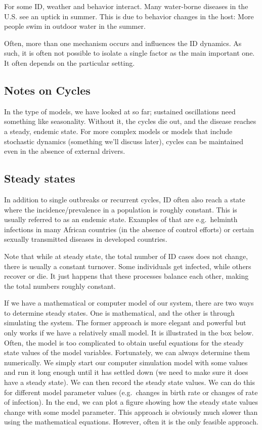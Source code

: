 \documentclass[]{article}
\theoremstyle{definition}
\theoremstyle{definition}
\theoremstyle{definition}
\theoremstyle{remark}
\begin{document}
For some ID, weather and behavior interact. Many water-borne diseases in
the U.S. see an uptick in summer. This is due to behavior changes in the
host: More people swim in outdoor water in the summer.

Often, more than one mechanism occurs and influences the ID dynamics. As
such, it is often not possible to isolate a single factor as the main
important one. It often depends on the particular setting.

\subsection{Notes on Cycles}\label{notes-on-cycles}

In the type of models, we have looked at so far; sustained oscillations
need something like seasonality. Without it, the cycles die out, and the
disease reaches a steady, endemic state. For more complex models or
models that include stochastic dynamics (something we'll discuss later),
cycles can be maintained even in the absence of external drivers.

\subsection{Steady states}\label{steady-states}

In addition to single outbreaks or recurrent cycles, ID often also reach
a state where the incidence/prevalence in a population is roughly
constant. This is usually referred to as an endemic state. Examples of
that are e.g.~helminth infections in many African countries (in the
absence of control efforts) or certain sexually transmitted diseases in
developed countries.

Note that while at steady state, the total number of ID cases does not
change, there is usually a constant turnover. Some individuals get
infected, while others recover or die. It just happens that these
processes balance each other, making the total numbers roughly constant.

If we have a mathematical or computer model of our system, there are two
ways to determine steady states. One is mathematical, and the other is
through simulating the system. The former approach is more elegant and
powerful but only works if we have a relatively small model. It is
illustrated in the box below. Often, the model is too complicated to
obtain useful equations for the steady state values of the model
variables. Fortunately, we can always determine them numerically. We
simply start our computer simulation model with some values and run it
long enough until it has settled down (we need to make sure it does have
a steady state). We can then record the steady state values. We can do
this for different model parameter values (e.g.~changes in birth rate or
changes of rate of infection). In the end, we can plot a figure showing
how the steady state values change with some model parameter. This
approach is obviously much slower than using the mathematical equations.
However, often it is the only feasible approach.
\end{document}
